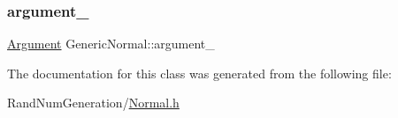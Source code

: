 \subsubsection{\texorpdfstring{argument\+\_\+}{argument\_}}
{\footnotesize\ttfamily \hyperlink{class_generic_normal_1_1_argument}{Argument} Generic\+Normal\+::argument\+\_\+\hspace{0.3cm}{\ttfamily [protected]}}



The documentation for this class was generated from the following file\+:\begin{DoxyCompactItemize}
\item 
Rand\+Num\+Generation/\hyperlink{_normal_8h}{Normal.\+h}\end{DoxyCompactItemize}
